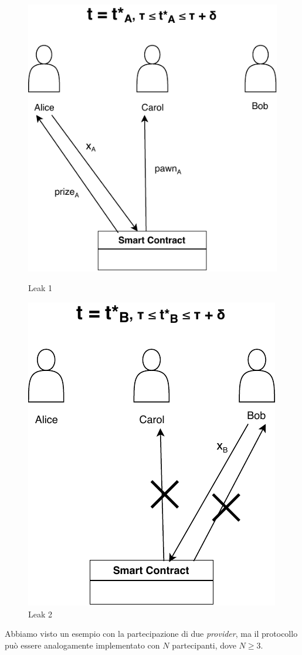\begin{figure}[H]
	\begin{minipage}{0.5\textwidth}
		\centering
		\includegraphics[width=.8\linewidth]{images/chap_protocollo/avanzato-leak-2-a.pdf}
		\caption{Leak 1}
	\end{minipage}\hfill
	\begin{minipage}{0.5\textwidth}
		\centering
		\includegraphics[width=.71\linewidth]{images/chap_protocollo/avanzato-leak-2-b.pdf}
		\caption{Leak 2}
	\end{minipage}
\end{figure}

Abbiamo visto un esempio con la partecipazione di due \textit{provider},
ma il protocollo
può essere analogamente implementato con $ N $ partecipanti, dove $ N \geq 3 $.

